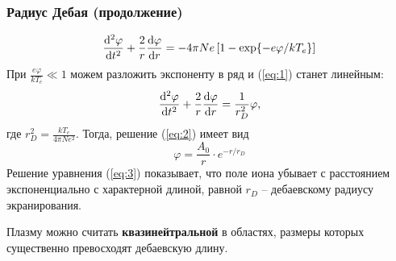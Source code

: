 \documentclass[10pt,pdf,hyperref={unicode}, dvipsnames]{beamer}
\renewcommand{\phi}{\varphi}
\begin{document}
\begin{frame}[t]\frametitle{Радиус Дебая (продолжение)}
	\begin{equation}
	\label{eq:1}
	\dv[2]{\phi}{t}+\frac2r\dv{\phi}{r}=-4\pi Ne\left[1 -\exp{-e\phi/kT_e}\right]
\end{equation}
При $\displaystyle \frac{e\phi}{kT_e}\ll1$ можем разложить экспоненту в ряд и (\ref{eq:1}) станет линейным:
\begin{equation}
	\label{eq:2}
	\dv[2]{\phi}{t}+\frac2r\dv{\phi}{r}=\frac{1}{r_D^2}\phi,
\end{equation}
где $\displaystyle r_D^2=\frac{kT_e}{4\pi Ne^2}$.
	Тогда, решение (\ref{eq:2}) имеет вид 
	\begin{equation}
		\label{eq:3}
		\phi=\frac{A_0}{r}\cdot e^{-r/r_D}
	\end{equation}  
    Решение уравнения (\ref{eq:3}) показывает, что поле иона убывает с расстоянием экспоненциально с характерной длиной, равной $r_D$ -- дебаевскому радиусу экранирования. 

    \vfill
    Плазму можно считать  \textbf{квазинейтральной} в областях, размеры которых существенно превосходят дебаевскую длину.
\end{frame}
\end{document}
